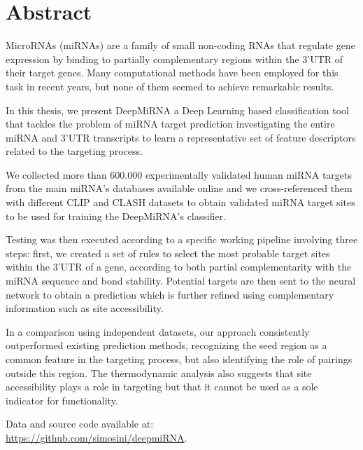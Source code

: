 \chapter*{Abstract}

MicroRNAs (miRNAs) are a family of small non-coding RNAs that regulate gene expression by binding to partially complementary regions within the 3’UTR of their target genes. Many computational methods have been employed for this task in recent years, but none of them seemed to achieve remarkable results.

In this thesis, we present DeepMiRNA a Deep Learning based classification tool that  tackles the problem of miRNA target prediction investigating the entire miRNA and 3'UTR transcripts to learn a representative set of feature descriptors related to the targeting process. 

We collected more than 600.000 experimentally validated human miRNA targets from the main miRNA's databases available online and we cross-referenced them with different CLIP and CLASH datasets to obtain validated mi\-RNA target sites to be used for training the DeepMiRNA's classifier. 

Testing was then executed according to a specific working pipeline involving three steps: first, we created a set of rules to select the most probable target sites within the 3'UTR of a gene, according to both partial complementarity with the miRNA sequence and bond stability. Potential targets are then sent to the neural network to obtain a prediction which is further refined using complementary information such as site accessibility. 

In a comparison using independent datasets, our approach consistently outperformed existing prediction methods, recognizing the seed region as a common feature in the targeting process, but also identifying the role of pairings outside this region. The thermodynamic analysis also suggests that site accessibility plays a role in targeting but that it cannot be used as a sole indicator for functionality.

Data and source code available at: \\ 
\url{https://github.com/simosini/deepmiRNA}.
